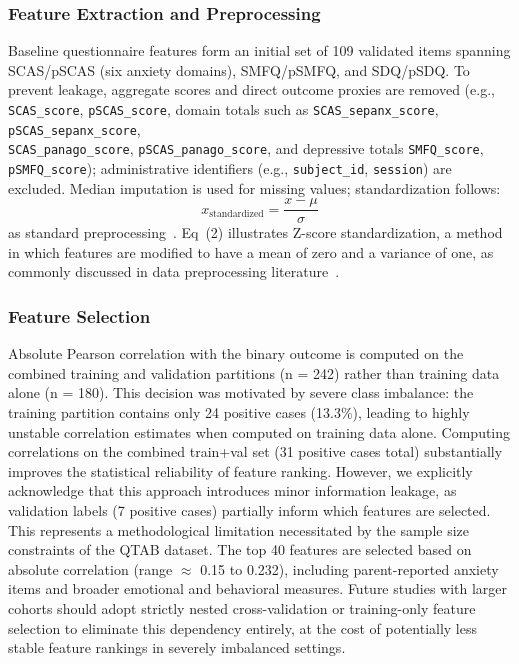 \documentclass[10pt,letterpaper]{article}
\begin{document}
\subsubsection*{\textbf{Feature Extraction and Preprocessing}}
Baseline questionnaire features form an initial set of 109 validated items spanning SCAS/pSCAS (six anxiety domains), SMFQ/pSMFQ, and SDQ/pSDQ. To prevent leakage, aggregate scores and direct outcome proxies are removed (e.g., \texttt{SCAS\_score}, \texttt{pSCAS\_score}, domain totals such as \texttt{SCAS\_sepanx\_score}, \texttt{pSCAS\_sepanx\_score}, \\
\texttt{SCAS\_panago\_score}, \texttt{pSCAS\_panago\_score}, and depressive totals \texttt{SMFQ\_score},\\
 \texttt{pSMFQ\_score}); administrative identifiers (e.g., \texttt{subject\_id}, \texttt{session}) are excluded. Median imputation is used for missing values; standardization follows:
\begin{equation}
x_{\text{standardized}} = \frac{x - \mu}{\sigma}
\end{equation}
as standard preprocessing~\cite{ref48}. Eq~(2) illustrates Z-score standardization, a method in which features are modified to have a mean of zero and a variance of one, as commonly discussed in data preprocessing literature~\cite{ref48}.

\subsubsection*{\textbf{Feature Selection}}
Absolute Pearson correlation with the binary outcome is computed on the combined training and validation partitions (n = 242) rather than training data alone (n = 180). This decision was motivated by severe class imbalance: the training partition contains only 24 positive cases (13.3\%), leading to highly unstable correlation estimates when computed on training data alone. Computing correlations on the combined train+val set (31 positive cases total) substantially improves the statistical reliability of feature ranking. However, we explicitly acknowledge that this approach introduces minor information leakage, as validation labels (7 positive cases) partially inform which features are selected. This represents a methodological limitation necessitated by the sample size constraints of the QTAB dataset. The top 40 features are selected based on absolute correlation (range $\approx$ 0.15 to 0.232), including parent-reported anxiety items and broader emotional and behavioral measures. Future studies with larger cohorts should adopt strictly nested cross-validation or training-only feature selection to eliminate this dependency entirely, at the cost of potentially less stable feature rankings in severely imbalanced settings.
\end{document}
